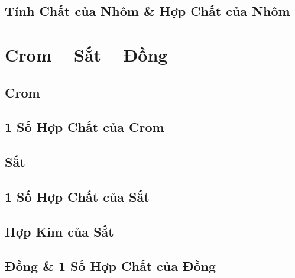 \documentclass{article}
\numberwithin{equation}{section}
\begin{document}
\subsection{Tính Chất của Nhôm \& Hợp Chất của Nhôm}


\section{Crom -- Sắt -- Đồng}

\subsection{Crom}


\subsection{1 Số Hợp Chất của Crom}


\subsection{Sắt}


\subsection{1 Số Hợp Chất của Sắt}


\subsection{Hợp Kim của Sắt}


\subsection{Đồng \& 1 Số Hợp Chất của Đồng}
\end{document}

